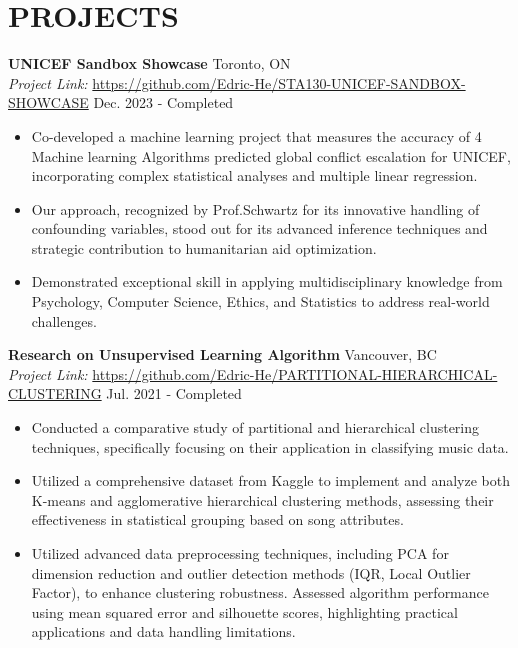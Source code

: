 \documentclass[a4paper,9pt]{extarticle}
\begin{document}
\section*{PROJECTS}
\noindent
\textbf{UNICEF Sandbox Showcase} \hfill Toronto, ON\\ %
\textit{Project Link:} \url{https://github.com/Edric-He/STA130-UNICEF-SANDBOX-SHOWCASE} \hfill Dec. 2023 - Completed %
\begin{itemize}
    \item Co-developed a machine learning project that measures the accuracy of 4 Machine learning Algorithms predicted global conflict escalation for UNICEF, incorporating complex statistical analyses and multiple linear regression.
    \item Our approach, recognized by Prof.Schwartz for its innovative handling of confounding variables, stood out for its advanced inference techniques and strategic contribution to humanitarian aid optimization.
    \item Demonstrated exceptional skill in applying multidisciplinary knowledge from Psychology, Computer Science, Ethics, and Statistics to address real-world challenges.
\end{itemize}
\noindent
\textbf{Research on Unsupervised Learning Algorithm} \hfill Vancouver, BC\\ %
\textit{Project Link:} \url{https://github.com/Edric-He/PARTITIONAL-HIERARCHICAL-CLUSTERING} \hfill Jul. 2021 - Completed %
\begin{itemize}
    \item Conducted a comparative study of partitional and hierarchical clustering techniques, specifically focusing on their application in classifying music data.
    \item Utilized a comprehensive dataset from Kaggle to implement and analyze both K-means and agglomerative hierarchical clustering methods, assessing their effectiveness in statistical grouping based on song attributes.
    \item Utilized advanced data preprocessing techniques, including PCA for dimension reduction and outlier detection methods (IQR, Local Outlier Factor), to enhance clustering robustness. Assessed algorithm performance using mean squared error and silhouette scores, highlighting practical applications and data handling limitations.
\end{itemize}
\end{document}
